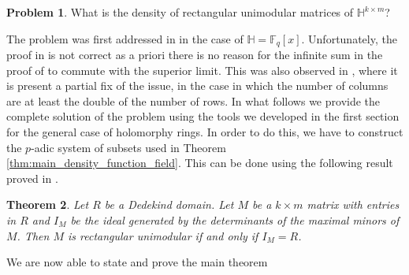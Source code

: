 \documentclass[10pt]{amsart}
\newcommand{\vF}{\mathbb{F}}
\newcommand{\vH}{\mathbb{H}}
\newtheorem{theorem}{Theorem}[section]
\theoremstyle{definition}
\newtheorem{problem}[theorem]{Problem}
\theoremstyle{remark}
\numberwithin{equation}{section}
\begin{document}
\begin{problem}
What is the density of rectangular unimodular matrices of $\vH^{k\times m}$?
\end{problem}
The problem was first addressed in \cite{ guo2013probability} in the case of $\vH=\vF_q[x]$.  Unfortunately, the proof in \cite{guo2013probability} is not correct  as a priori there is no reason for the infinite sum in the proof of \cite[Theorem 1]{guo2013probability} to commute with the superior limit. This was also observed in \cite{micheli2016density}, where it is present a partial fix of the issue, in the case in which the number of columns are at least the double of the number of rows.
In what follows we provide the complete solution of the problem using the tools we developed in the first section for the general case of holomorphy rings. In order to do this, we have to construct the $p$-adic system of subsets used in Theorem \ref{thm:main_density_function_field}. This can be done using the following result proved in \cite{gustafson1981matrix}.

\begin{theorem}\label{dedekindextension}
Let $R$ be a Dedekind domain. Let $M$ be a $k\times m$ matrix with entries in $R$ and $I_M$ be the ideal generated by the determinants of the maximal minors of $M$. 
Then $M$ is rectangular unimodular if and only if $I_M=R$.
\end{theorem}

We are now able to state and prove the main theorem
\end{document}
